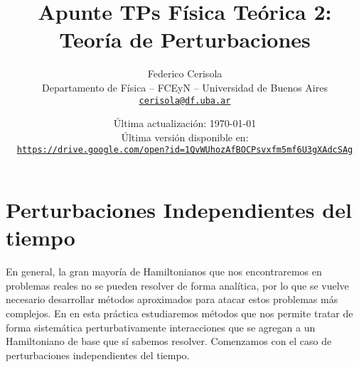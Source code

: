 \documentclass[10pt, a4paper]{article}
\numberwithin{equation}{subsection}
\begin{document}
\title{Apunte TPs Física Teórica 2: Teoría de Perturbaciones}
\author{Federico Cerisola
  \\ \small{Departamento de Física -- FCEyN -- Universidad de Buenos Aires}
  \\ \small{\href{mailto:cerisola@df.uba.ar}{\nolinkurl{cerisola@df.uba.ar}}}
}
\date{\small Última actualización: \today \\[1em]
  Última versión disponible en: \\
  \texttt{
    \href{https://drive.google.com/open?id=1QvWUhozAfBOCPsvxfm5mf6U3gXAdcSAg}
    {https://drive.google.com/open?id=1QvWUhozAfBOCPsvxfm5mf6U3gXAdcSAg}
  }}
\maketitle
\thispagestyle{empty}

\vfill
\doclicenseThis

\pagebreak

\newpage
  \tableofcontents
\newpage

\section{Perturbaciones Independientes del tiempo}
En general, la gran mayoría de Hamiltonianos que nos encontraremos en problemas
reales no se pueden resolver de forma analítica, por lo que se vuelve
necesario desarrollar métodos aproximados para atacar estos problemas más
complejos. En en esta práctica estudiaremos métodos que nos permite tratar de
forma sistemática perturbativamente interacciones que se agregan a un
Hamiltoniano de base que sí sabemos resolver.
Comenzamos con el caso de perturbaciones independientes del tiempo.

\end{document}
